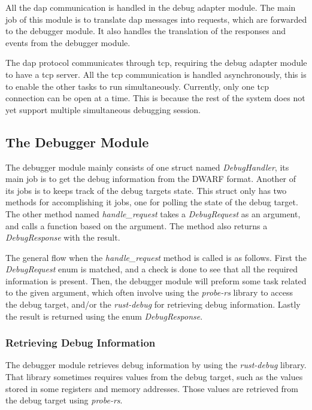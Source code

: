 All the \gls{dap} communication is handled in the debug adapter module.
The main job of this module is to translate \gls{dap} messages into requests, which are forwarded to the debugger module.
It also handles the translation of the responses and events from the debugger module.


The \gls{dap} protocol communicates through \gls{tcp}, requiring the debug adapter module to have a \gls{tcp} server.
All the \gls{tcp} communication is handled asynchronously, this is to enable the other tasks to run simultaneously.
Currently, only one \gls{tcp} connection can be open at a time.
This is because the rest of the system does not yet support multiple simultaneous debugging session.



\subsection{The Debugger Module}
The debugger module mainly consists of one struct named \emph{DebugHandler}, its main job is to get the debug information from the \gls{DWARF} format.
Another of its jobs is to keeps track of the debug targets state.
This struct only has two methods for accomplishing it jobs, one for polling the state of the debug target.
The other method named \emph{handle\_request} takes a \emph{DebugRequest} as an argument, and calls a function based on the argument.
The method also returns a \emph{DebugResponse} with the result.


The general flow when the \emph{handle\_request} method is called is as follows.
First the \emph{DebugRequest} enum is matched, and a check is done to see that all the required information is present.
Then, the debugger module will preform some task related to the given argument, which often involve using the \emph{probe-rs} library to access the debug target, and/or the \emph{rust-debug} for retrieving debug information.
Lastly the result is returned using the enum \emph{DebugResponse}.



\subsubsection{Retrieving Debug Information}
The debugger module retrieves debug information by using the \emph{rust-debug} library.
That library sometimes requires values from the debug target, such as the values stored in some registers and memory addresses.
Those values are retrieved from the debug target using \emph{probe-rs}.



